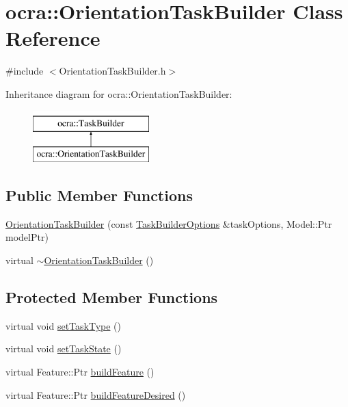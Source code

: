 \hypertarget{classocra_1_1OrientationTaskBuilder}{}\section{ocra\+:\+:Orientation\+Task\+Builder Class Reference}
\label{classocra_1_1OrientationTaskBuilder}


{\ttfamily \#include $<$Orientation\+Task\+Builder.\+h$>$}

Inheritance diagram for ocra\+:\+:Orientation\+Task\+Builder\+:\begin{figure}[H]
\begin{center}
\leavevmode
\includegraphics[height=2.000000cm]{da/d8d/classocra_1_1OrientationTaskBuilder}
\end{center}
\end{figure}
\subsection*{Public Member Functions}
\begin{DoxyCompactItemize}
\item 
\hyperlink{classocra_1_1OrientationTaskBuilder_ae21c16c5b7c2f47aaff15a33cc49a337}{Orientation\+Task\+Builder} (const \hyperlink{classocra_1_1TaskBuilderOptions}{Task\+Builder\+Options} \&task\+Options, Model\+::\+Ptr model\+Ptr)
\item 
virtual \hyperlink{classocra_1_1OrientationTaskBuilder_a15053032636ee9416465134314a18226}{$\sim$\+Orientation\+Task\+Builder} ()
\end{DoxyCompactItemize}
\subsection*{Protected Member Functions}
\begin{DoxyCompactItemize}
\item 
virtual void \hyperlink{classocra_1_1OrientationTaskBuilder_a491f3d3db66afb5b5e3230983b4b15c9}{set\+Task\+Type} ()
\item 
virtual void \hyperlink{classocra_1_1OrientationTaskBuilder_ab30b211f4aa00ed4c78daae36aca6c42}{set\+Task\+State} ()
\item 
virtual Feature\+::\+Ptr \hyperlink{classocra_1_1OrientationTaskBuilder_a38d5badfcdbcdbc745f305e38af8b737}{build\+Feature} ()
\item 
virtual Feature\+::\+Ptr \hyperlink{classocra_1_1OrientationTaskBuilder_af5f11bdd9c43cb52e29054c6b293d533}{build\+Feature\+Desired} ()
\end{DoxyCompactItemize}
